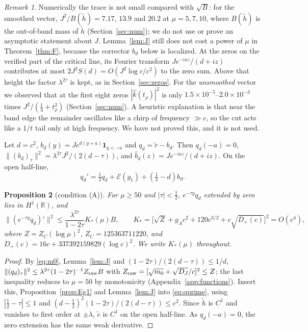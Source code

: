 \documentclass[11pt]{amsart}
\newtheorem{proposition}{Proposition}[section]
\theoremstyle{remark}
\newtheorem{remark}[proposition]{Remark}
\numberwithin{equation}{section}
\newcommand{\R}{\mathbb{R}}
\newcommand{\E}{\mathcal{E}}
\begin{document}
\begin{remark}\label{rem:J}
Numerically the trace is not small compared with $\sqrt B$: for the smoothed vector, $J^2/B(\tilde h)=7.17$, $13.9$ and $20.2$ at $\mu=5,7,10$, where $B(\tilde h)$ is the out-of-band mass of $\tilde h$ (Section~\ref{sec:num}); we do not use or prove an asymptotic statement about $J$. Lemma~\ref{lem:J} still does not cost a power of $\mu$ in Theorem~\ref{thm:F}, because the corrector $b_d$ below is localized. At the zeros on the verified part of the critical line, its Fourier transform $Je^{-iaz}/(d+iz)$ contributes at most $2J^2S(d)=O(J^2\log c/c^2)$ to the zero sum. Above that height the factor $\lambda^{2\tau}$ is kept, as in Section~\ref{sec:zeros}. For the \emph{unsmoothed} vector we observed that at the first eight zeros $|\hat k(t_\rho)|^2$ is only $1.5\times10^{-5}$--$2.0\times10^{-3}$ times $J^2/(\frac14+t_\rho^2)$ (Section~\ref{sec:num}). A heuristic explanation is that near the band edge the remainder oscillates like a chirp of frequency $\gg c$, so the cut acts like a $1/t$ tail only at high frequency. We have not proved this, and it is not used.
\end{remark}

Let $d=c^2$, $b_d(y)=Je^{d(y+a)}\mathbf 1_{y<-a}$ and $q_d=\tilde r-b_d$. Then $q_d(-a)=0$, $\|(b_d)_\tau\|^2=\lambda^{2\tau}J^2/(2(d-\tau))$, and $\hat b_d(z)=Je^{-iaz}/(d+iz)$. On the open half-line,
\begin{equation}\label{eq:qprime}
q_d'=\tfrac12q_d+\E(g_1)+(\tfrac12-d)b_d.
\end{equation}

\begin{proposition}[condition (A)]\label{prop:A}
For $\mu\ge50$ and $|\tau|<\frac12$, $e^{-\tau y}q_d$ extended by zero lies in $H^1(\R)$, and
\[
\|(e^{-\tau y}q_d)'\|^2\le\frac{\lambda^{2\tau}}{1-2\tau}K_*(\mu)B,\qquad K_*=\bigl[\sqrt Z+g_Ac^2+120c^{3/2}+c\sqrt{D_+(c)}\bigr]^2=O(c^4),
\]
where $Z=Z_C(\log\mu)^2$, $Z_C=125363711220$, and $D_+(c)=16c+337392159829(\log c)^2$. We write $K_*(\mu)$ throughout.
\end{proposition}
\begin{proof}
By \eqref{eq:m0}, Lemma~\ref{lem:J} and $(1-2\tau)/(2(d-\tau))\le1/d$, $\|(q_d)_\tau\|^2\le\lambda^{2\tau}(1-2\tau)^{-1}Z_{\rm raw}B$ with $Z_{\rm raw}=[\sqrt{m_0}+\sqrt{D_J}/c]^2\le Z$; the last inequality reduces to $\mu=50$ by monotonicity (Appendix~\ref{app:functions}). Insert this, Proposition~\ref{prop:Eg1} and Lemma~\ref{lem:J} into \eqref{eq:qprime}, using $|\frac12-\tau|\le1$ and $(d-\frac12)^2(1-2\tau)/(2(d-\tau))\le c^2$. Since $\tilde h$ is $C^1$ and vanishes to first order at $\pm\lambda$, $\tilde e$ is $C^1$ on the open half-line. As $q_d(-a)=0$, the zero extension has the same weak derivative.
\end{proof}
\end{document}
